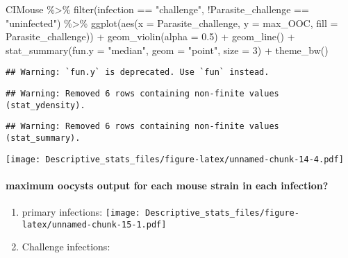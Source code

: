 \documentclass[
]{article}
\newenvironment{Shaded}{\begin{snugshade}}{\end{snugshade}}
\newcommand{\AttributeTok}[1]{\textcolor[rgb]{0.77,0.63,0.00}{#1}}
\newcommand{\DecValTok}[1]{\textcolor[rgb]{0.00,0.00,0.81}{#1}}
\newcommand{\FloatTok}[1]{\textcolor[rgb]{0.00,0.00,0.81}{#1}}
\newcommand{\FunctionTok}[1]{\textcolor[rgb]{0.00,0.00,0.00}{#1}}
\newcommand{\NormalTok}[1]{#1}
\newcommand{\SpecialCharTok}[1]{\textcolor[rgb]{0.00,0.00,0.00}{#1}}
\newcommand{\StringTok}[1]{\textcolor[rgb]{0.31,0.60,0.02}{#1}}
\begin{document}
\begin{Shaded}
\begin{Highlighting}[]
\NormalTok{CIMouse  }\SpecialCharTok{\%\textgreater{}\%}
    \FunctionTok{filter}\NormalTok{(infection }\SpecialCharTok{==} \StringTok{"challenge"}\NormalTok{, }\SpecialCharTok{!}\NormalTok{Parasite\_challenge }\SpecialCharTok{==} \StringTok{"uninfected"}\NormalTok{)  }\SpecialCharTok{\%\textgreater{}\%}
  \FunctionTok{ggplot}\NormalTok{(}\FunctionTok{aes}\NormalTok{(}\AttributeTok{x =}\NormalTok{ Parasite\_challenge, }\AttributeTok{y =}\NormalTok{ max\_OOC, }\AttributeTok{fill =}\NormalTok{ Parasite\_challenge)) }\SpecialCharTok{+}
  \FunctionTok{geom\_violin}\NormalTok{(}\AttributeTok{alpha =} \FloatTok{0.5}\NormalTok{) }\SpecialCharTok{+}
    \FunctionTok{geom\_line}\NormalTok{() }\SpecialCharTok{+}
     \FunctionTok{stat\_summary}\NormalTok{(}\AttributeTok{fun.y =} \StringTok{"median"}\NormalTok{, }\AttributeTok{geom =} \StringTok{"point"}\NormalTok{, }\AttributeTok{size =} \DecValTok{3}\NormalTok{) }\SpecialCharTok{+}
    \FunctionTok{theme\_bw}\NormalTok{() }
\end{Highlighting}
\end{Shaded}

\begin{verbatim}
## Warning: `fun.y` is deprecated. Use `fun` instead.
\end{verbatim}

\begin{verbatim}
## Warning: Removed 6 rows containing non-finite values (stat_ydensity).
\end{verbatim}

\begin{verbatim}
## Warning: Removed 6 rows containing non-finite values (stat_summary).
\end{verbatim}

\texttt{[image: Descriptive\_stats\_files/figure-latex/unnamed-chunk-14-4.pdf]}

\hypertarget{maximum-oocysts-output-for-each-mouse-strain-in-each-infection}{%
\paragraph{maximum oocysts output for each mouse strain in each
infection?}\label{maximum-oocysts-output-for-each-mouse-strain-in-each-infection}}

\begin{enumerate}
\def\labelenumi{\arabic{enumi}.}
\item
  primary infections:
  \texttt{[image: Descriptive\_stats\_files/figure-latex/unnamed-chunk-15-1.pdf]}
\item
  Challenge infections:
\end{enumerate}
\end{document}
